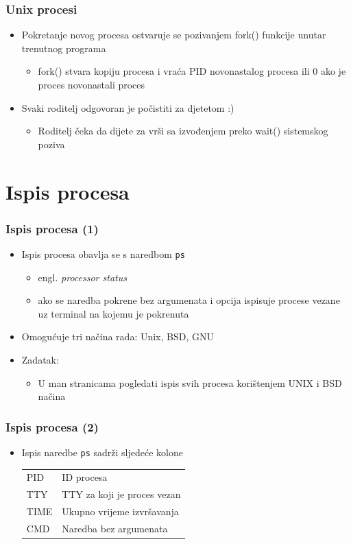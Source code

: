 \documentclass[table,usenames,dvipsnames]{beamer}
\newcommand{\shell}[1]{\texttt{#1}}
\begin{document}
\begin{frame}[t]
\frametitle{Unix procesi}
\begin{itemize}
  \item Pokretanje novog procesa ostvaruje se pozivanjem fork() funkcije unutar
        trenutnog programa
  \begin{itemize}
    \item fork() stvara kopiju procesa i vraća PID novonastalog procesa ili 0 
          ako je proces novonastali proces
  \end{itemize}
  \item Svaki roditelj odgovoran je počistiti za djetetom :)
  \begin{itemize}
    \item Roditelj čeka da dijete za vrši sa izvođenjem preko wait() sistemskog
          poziva
  \end{itemize}
\end{itemize}
\end{frame}

\section{Ispis procesa}
\begin{frame}[t]
\frametitle{Ispis procesa (1)}
\begin{itemize}
  \item Ispis procesa obavlja se s naredbom \shell{ps} 
  \begin{itemize}
    \item engl. \emph{processor status}
    \item ako se naredba pokrene bez argumenata i opcija ispisuje procese 
          vezane uz terminal na kojemu je pokrenuta
  \end{itemize}
  \item Omogućuje tri načina rada: Unix, BSD, GNU
  \item Zadatak:
  \begin{itemize}
    \item U man stranicama pogledati ispis svih procesa korištenjem UNIX i BSD 
          načina
  \end{itemize}
\end{itemize}
\end{frame}

\begin{frame}[t]
\frametitle{Ispis procesa (2)}
\begin{itemize}
  \item Ispis naredbe \shell{ps} sadrži sljedeće kolone
  \begin{tabular}{l l}
    PID   & ID procesa \\
    TTY   & TTY za koji je proces vezan \\
    TIME  & Ukupno vrijeme izvršavanja  \\
    CMD   & Naredba bez argumenata
  \end{tabular}
\end{itemize}
\end{frame}
\end{document}
